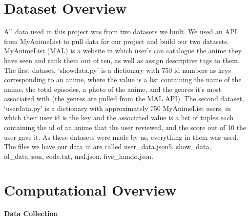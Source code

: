 \documentclass[fontsize=11pt]{article}
\begin{document}
\section*{Dataset Overview}
All data used in this project was from two datasets we built. We used an API from MyAnimeList to pull data for our project and build our two datasets. MyAnimeList (MAL) is a website in which user’s can catalogue the anime they have seen and rank them out of ten, as well as assign descriptive tags to them. The first dataset, ‘showdata.py’ is a dictionary with 750 id numbers as keys corresponding to an anime, where the value is a list containing the name of the anime, the total episodes, a photo of the anime, and the genres it’s most associated with (the genres are pulled from the MAL API). The second dataset, ‘userdata.py’ is a dictionary with approximately 750 MyAnimeList users, in which their user id is the key and the associated value is a list of tuples each containing the id of an anime that the user reviewed, and the score out of 10 the user gave it. As these datasets were made by us, everything in them was used. The files we have our data in are called user\_data.json5, show\_data, id\_data.json, code.txt, mal.json, five\_hundo.json.

\section*{Computational Overview}
\textbf{Data Collection}
\end{document}
